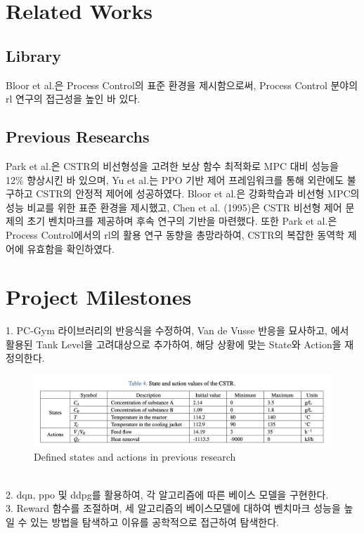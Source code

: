 \documentclass[11pt]{article}
\begin{document}
\section{Related Works}

\subsection{Library}
Bloor et al.은 Process Control의 표준 환경을 제시함으로써, Process Control 분야의 \gls{rl} 연구의 접근성을 높인 바 있다.\cite{MaximilianB2pcgym}


\subsection{Previous Researchs}
Park et al.은 CSTR의 비선형성을 고려한 보상 함수 최적화로 MPC 대비 성능을 12\% 향상시킨 바 있으며\cite{Park2024rl}, 
Yu et al.는 PPO 기반 제어 프레임워크를 통해 외란에도 불구하고 CSTR의 안정적 제어에 성공하였다.\cite{Yu2025ppo}
Bloor et al.은 강화학습과 비선형 MPC의 성능 비교를 위한 표준 환경을 제시했고\cite{bloor2024pcgym}, 
Chen et al. (1995)은 CSTR 비선형 제어 문제의 초기 벤치마크를 제공하며 후속 연구의 기반을 마련했다.\cite{chen1995benchmark}
또한 Park et al.은 Process Control에서의 \gls{rl}의 활용 연구 동향을 총망라하여, CSTR의 복잡한 동역학 제어에 유효함을 확인하였다.\cite{Park2025pc}


\section{Project Milestones}
1. PC-Gym 라이브러리의 반응식을 수정하여, Van de Vusse 반응을 묘사하고, \cite{Yu2025ppo} 에서 활용된 Tank Level을 고려대상으로 추가하여,
해당 상황에 맞는 State와 Action을 재정의한다.\\
\begin{figure}[h!]
    \centering
    \includegraphics[width=\textwidth]{ref_table1.png} %
    \caption{Defined states and actions in previous research}
    \label{fig1}
\end{figure}
\\
2. \gls{dqn}, \gls{ppo} 및 \gls{ddpg}를 활용하여, 각 알고리즘에 따른 베이스 모델을 구현한다.\\
3. Reward 함수를 조절하며, 세 알고리즘의 베이스모델에 대하여 벤치마크 성능을 높일 수 있는 방법을 탐색하고 이유를 공학적으로 접근하여 탐색한다.




\end{document}
